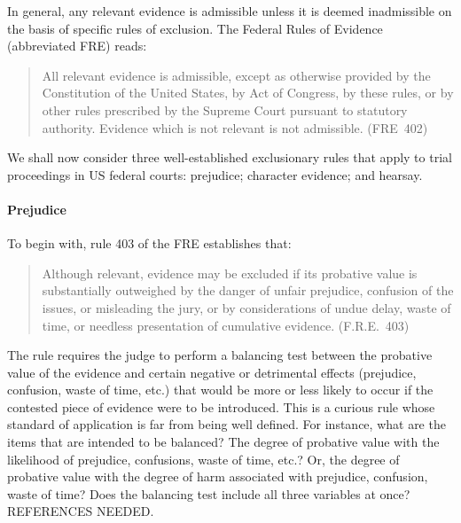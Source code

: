 \documentclass[10pt]{article}
\begin{document}
In general, any relevant evidence is admissible 
unless it is deemed inadmissible on the basis of specific rules of exclusion. %
The Federal Rules of Evidence (abbreviated FRE) reads:
%
\begin{quote}
\begin{singlespace}
All relevant evidence is admissible, except as otherwise provided by the Constitution of the United States, by Act of Congress, by these rules, or by other rules prescribed by the Supreme Court pursuant to statutory authority. Evidence which is not relevant is not admissible. (FRE\ 402)
\end{singlespace}
\end{quote}
%

We shall now consider three well-established exclusionary rules 
that apply to trial proceedings in US federal courts: 
prejudice; character evidence; and hearsay. 

\paragraph{Prejudice}
To begin with, rule 403 of the FRE 
establishes that:
%
\begin{quote}
\begin{singlespace}
Although relevant, evidence may be excluded if its probative value is substantially outweighed by the danger of unfair prejudice, confusion of the issues, or misleading the jury, or by considerations of undue delay, waste of time, or needless presentation of cumulative evidence. (F.R.E.\ 403)
\end{singlespace}
\end{quote}
%
The rule requires the judge to perform a balancing test between the probative value of the evidence 
and certain negative or detrimental effects (prejudice, confusion, waste of time, etc.) that 
would be more or less likely to occur if the contested piece of evidence were to be introduced.
This is a curious rule whose standard of application is far from being 
well defined. For instance, what are the items that are intended to be balanced? 
The degree of probative value with the likelihood of prejudice, confusions, waste of time, etc.? 
Or, the degree of probative value with the degree of harm associated with prejudice, confusion, waste of time? Does the balancing 
test include all three variables at once?  REFERENCES NEEDED.
\end{document}
